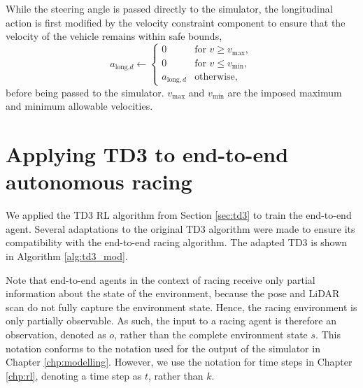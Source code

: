 While the steering angle is passed directly to the simulator, the longitudinal action is first modified by the velocity constraint component to ensure that the velocity of the vehicle remains within safe bounds,
\begin{equation}
    a_{\text{long,}d} \leftarrow 
    \begin{cases}
    0                   &   \text{for } v \geq v_{\text{max}}, \\
    0                   &   \text{for } v \leq v_{\text{min}}, \\
    a_{\text{long},d}   &   \text{otherwise},
    \end{cases}
\label{eq:speed_limit}
\end{equation}
before being passed to the simulator. $v_{\text{max}}$ and $v_{\text{min}}$ are the imposed maximum and minimum allowable velocities.




\section{Applying TD3 to end-to-end autonomous racing}\label{sec:td3_end_to_end}

We applied the TD3 RL algorithm from Section \ref{sec:td3} to train the end-to-end agent.
Several adaptations to the original TD3 algorithm were made to ensure its compatibility with the end-to-end racing algorithm.
The adapted TD3 is shown in Algorithm \ref{alg:td3_mod}.



Note that end-to-end agents in the context of racing receive only partial information about the state of the environment, because the pose and LiDAR scan do not fully capture the environment state.
Hence, the racing environment is only partially observable.
As such, the input to a racing agent is therefore an observation, denoted as $o$, rather than the complete environment state $s$.
This notation conforms to the notation used for the output of the simulator in Chapter \ref{chp:modelling}.
However, we use the notation for time steps in Chapter \ref{chp:rl}, denoting a time step as $t$, rather than $k$.


